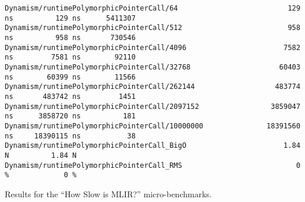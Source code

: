 \begin{code}
\begin{verbatim}
Dynamism/runtimePolymorphicPointerCall/64                          129 ns          129 ns      5411307
Dynamism/runtimePolymorphicPointerCall/512                         958 ns          958 ns       730546
Dynamism/runtimePolymorphicPointerCall/4096                       7582 ns         7581 ns        92110
Dynamism/runtimePolymorphicPointerCall/32768                     60403 ns        60399 ns        11566
Dynamism/runtimePolymorphicPointerCall/262144                   483774 ns       483742 ns         1451
Dynamism/runtimePolymorphicPointerCall/2097152                 3859047 ns      3858720 ns          181
Dynamism/runtimePolymorphicPointerCall/10000000               18391560 ns     18390115 ns           38
Dynamism/runtimePolymorphicPointerCall_BigO                       1.84 N          1.84 N
Dynamism/runtimePolymorphicPointerCall_RMS                           0 %             0 %
    \end{verbatim}
    \caption{Results for the ``How Slow is MLIR?'' micro-benchmarks.}
    \label{listing:how-slow-is-mlir-microbenchmark-results}
\end{code}
